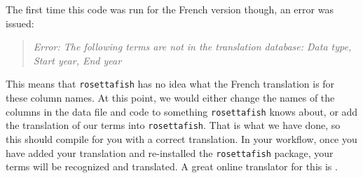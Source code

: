 \documentclass[12pt]{article}\usepackage[]{graphicx}\usepackage[]{color}
\begin{document}
The first time this code was run for the French version though, an error was issued:
\begin{quote}
\emph{Error: The following terms are not in the translation database: Data type, Start year, End year}
\end{quote}
This means that \texttt{rosettafish} has no idea what the French translation is for these column names. At this point, we would either change the names of the columns in the data file and code to something \texttt{rosettafish} knows about, or add the translation of our terms into \texttt{rosettafish}. That is what we have done, so this should compile for you with a correct translation. In your workflow, once you have added your translation and re-installed the \texttt{rosettafish} package, your terms will be recognized and translated. A great online translator for this is .
\end{document}
